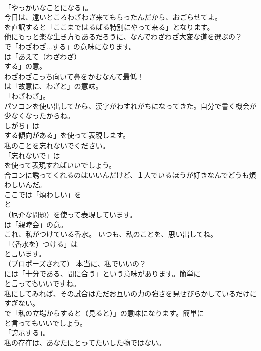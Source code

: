 \documentclass[8pt]{extreport}
\begin{document}
\begin{CJK}{UTF8}{min}
\\	「やっかいなことになる」。	
\\	今日は、遠いところわざわざ来てもらったんだから、おごらせてよ。 
\\	を直訳すると「ここまではるばる特別にやって来る」となります。	
\\	他にもっと楽な生き方もあるだろうに、なんでわざわざ大変な道を選ぶの？ 
\\	で「わざわざ...する」の意味になります。
\\	は「あえて（わざわざ） 
\\	する」の意。	
\\	わざわざこっち向いて鼻をかむなんて最低！ 
\\	は「故意に、わざと」の意味。
\\	「わざわざ」。	
\\	パソコンを使い出してから、漢字がわすれがちになってきた。自分で書く機会が少なくなったからね。 
\\	しがち」は
\\	する傾向がある」を使って表現します。	
\\	私のことを忘れないでください。 
\\	「忘れないで」は 
\\	を使って表現すればいいでしょう。	
\\	合コンに誘ってくれるのはいいんだけど、１人でいるほうが好きなんでどうも煩わしいんだ。 
\\	ここでは「煩わしい」を 
\\	と 
\\	（厄介な問題）を使って表現しています。
\\	は「親睦会」の意。	
\\	これ、私がつけている香水。 いつも、私のことを、思い出してね。 
\\	「（香水を）つける」は
\\	と言います。	
\\	（プロポーズされて） 本当に、私でいいの？ 
\\	には「十分である、間に合う」という意味があります。簡単に
\\	と言ってもいいですね。	
\\	私にしてみれば、その試合はただお互いの力の強さを見せびらかしているだけにすぎない。 
\\	で「私の立場からすると（見ると）」の意味になります。簡単に
\\	と言ってもいいでしょう。
\\	「誇示する」。	
\\	私の存在は、あなたにとってたいした物ではない。 

\end{CJK}
\end{document}

